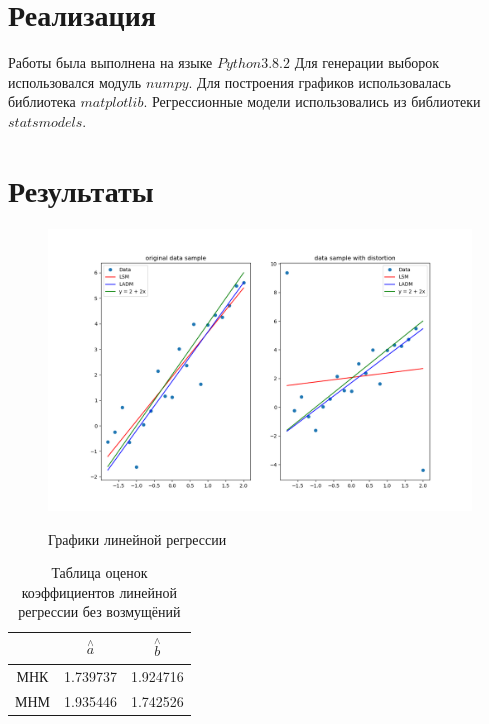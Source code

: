 \documentclass[a4]{article}
\begin{document}
\section{Реализация}
Работы была выполнена на языке $Python 3.8.2$
Для генерации выборок использовался модуль $numpy$.
Для построения графиков использовалась библиотека $matplotlib$.
Регрессионные модели использовались из библиотеки $statsmodels$.

\section{Результаты}

\begin{figure}[H]
    \centering
    \caption{Графики линейной регрессии}
    \includegraphics[scale = 0.6]{graph.png} 
    \label{fig:reg}
\end{figure}

\begin{table}[H]
\caption{Таблица оценок коэффициентов линейной регрессии без возмущёний}
\label{tab:my_label1}
\begin{center}
\vspace{5mm}
\begin{tabular}{|c|c|c|}
\hline
& $\overset{\wedge}{a}$ & $\overset{\wedge}{b}$\\
\hline
МНК &1.739737&1.924716\\
\hline
МНМ &1.935446&1.742526\\
\hline
\end{tabular}
\end{center}
\end{table}
\end{document}
